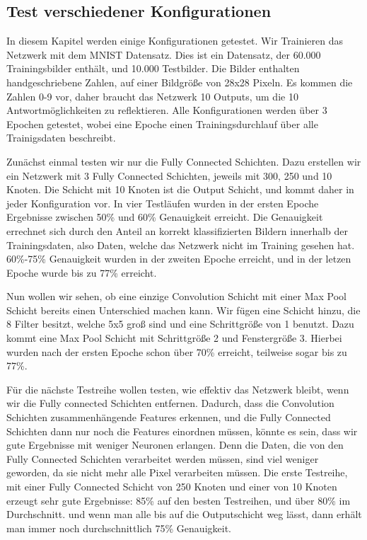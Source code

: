 \documentclass[12pt]{article}
\begin{document}
\subsection{Test verschiedener Konfigurationen}
In diesem Kapitel werden einige Konfigurationen getestet. Wir Trainieren das Netzwerk mit dem MNIST Datensatz. Dies ist ein Datensatz, der 60.000 Trainingsbilder enthält, und 10.000 Testbilder. Die Bilder enthalten handgeschriebene Zahlen, auf einer Bildgröße von 28x28 Pixeln. Es kommen die Zahlen 0-9 vor, daher braucht das Netzwerk 10 Outputs, um die 10 Antwortmöglichkeiten zu reflektieren. Alle Konfigurationen werden über 3 Epochen getestet, wobei eine Epoche einen Trainingsdurchlauf über alle Trainigsdaten beschreibt.

Zunächst einmal testen wir nur die Fully Connected Schichten. Dazu erstellen wir ein Netzwerk mit 3 Fully Connected Schichten, jeweils mit 300, 250 und 10 Knoten.
Die Schicht mit 10 Knoten ist die Output Schicht, und kommt daher in jeder Konfiguration vor. 
In vier Testläufen wurden in der ersten Epoche Ergebnisse zwischen 50\% und 60\% Genauigkeit erreicht. Die Genauigkeit errechnet sich durch den Anteil an korrekt klassifizierten Bildern innerhalb der Trainingsdaten, also Daten, welche das Netzwerk nicht im Training gesehen hat. 60\%-75\% Genauigkeit wurden in der zweiten Epoche erreicht, und in der letzen Epoche wurde bis zu 77\% erreicht.

Nun wollen wir sehen, ob eine einzige Convolution Schicht mit einer Max Pool Schicht bereits einen Unterschied machen kann. Wir fügen eine Schicht hinzu, die 8 Filter besitzt, welche 5x5 groß sind und eine Schrittgröße von 1 benutzt. Dazu kommt eine Max Pool Schicht mit Schrittgröße 2 und Fenstergröße 3.
Hierbei wurden nach der ersten Epoche schon über 70\% erreicht, teilweise sogar bis zu 77\%. 

Für die nächste Testreihe wollen testen, wie effektiv das Netzwerk bleibt, wenn wir die Fully connected Schichten entfernen. Dadurch, dass die Convolution Schichten zusammenhängende Features erkennen, und die Fully Connected Schichten dann nur noch die Features einordnen müssen, könnte es sein, dass wir gute Ergebnisse mit weniger Neuronen erlangen. Denn die Daten, die von den Fully Connected Schichten verarbeitet werden müssen, sind viel weniger geworden, da sie nicht mehr alle Pixel verarbeiten müssen.
Die erste Testreihe, mit einer Fully Connected Schicht von 250 Knoten und einer von 10 Knoten erzeugt sehr gute Ergebnisse: 85\% auf den besten Testreihen, und über 80\% im Durchschnitt.
und wenn man alle bis auf die Outputschicht weg lässt, dann erhält man immer noch durchschnittlich 75\% Genauigkeit.
\end{document}
